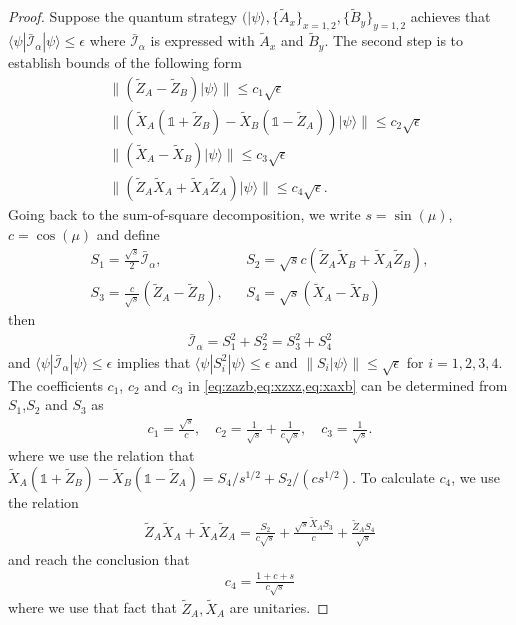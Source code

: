 \documentclass[11pt,letterpaper]{article}
\newcommand{\ket}[1]{|#1\rangle}
\newcommand{\bra}[1]{\langle#1|}
\newcommand{\1}{\mathbb{1}}
\newcommand{\tA}{\tilde{A}}
\newcommand{\tB}{\tilde{B}}
\newcommand{\I}{\mathcal{I}}
\theoremstyle{definition}
\begin{document}
\begin{proof}
Suppose the quantum strategy $(\ket{\psi}, \{\tilde{A}_x\}_{x=1,2}, \{\tilde{B}_{y }\}_{y=1,2}$ achieves that 
$\bra{\psi} \bar{\I}_\alpha \ket{\psi} \leq \epsilon$ where
$\bar{\I}_\alpha$ is expressed with $\tA_x$ and $\tB_y$.
The second step is to establish bounds of the following form
\begin{align}
	\label{eq:zazb} &\|(\tilde{Z}_A-\tilde{Z}_B)\ket{\psi}\| \leq c_1 \sqrt{\epsilon}\\
	\label{eq:xzxz}&\|(\tilde{X}_A(\1+\tilde{Z}_B)-\tilde{X}_B(\1-\tilde{Z}_A))\ket{\psi}\| \leq c_2 \sqrt{\epsilon}\\
	\label{eq:xaxb}&\|(\tilde{X}_A-\tilde{X}_B)\ket{\psi}\| \leq c_3 \sqrt{\epsilon}\\
	\label{eq:anticom} &\|(\tilde{Z}_A\tilde{X}_A+\tilde{X}_A\tilde{Z}_A)\ket{\psi}\| \leq c_4 \sqrt{\epsilon}.
\end{align}
Going back to the sum-of-square decomposition, we write $s = \sin(\mu)$, $c = \cos(\mu)$ and define
\begin{align*}
	S_1 = \frac{\sqrt{s}}{2} \bar{\I}_\alpha, &&
	S_2 = \sqrt{s}c(\tilde{Z}_A\tilde{X}_B+\tilde{X}_A\tilde{Z}_B),\\
	S_3 = \frac{c}{\sqrt{s}}(\tilde{Z}_A-\tilde{Z}_B), &&
	S_4 = \sqrt{s}(\tilde{X}_A-\tilde{X}_B)
\end{align*}
then 
\begin{align}
\bar{\I}_\alpha = S_1^2 + S_2^2 = S_3^2 + S_4^2
\end{align}
 and $\bra{\psi}\bar{\I}_\alpha \ket{\psi} \leq \epsilon$ implies that 
$\bra{\psi}S^2_i \ket{\psi} \leq \epsilon$ and $\|S_i \ket{\psi} \| \leq \sqrt{\epsilon}$ for $i = 1,2,3,4$.
The coefficients $c_1$, $c_2$ and $c_3$ in \cref{eq:zazb,eq:xzxz,eq:xaxb} can be determined from $S_1$,$S_2$ and $S_3$ as
\begin{align*}
	c_1 = \frac{\sqrt{s}}{c}, \quad
	c_2 = \frac{1}{\sqrt{s}} + \frac{1}{c\sqrt{s}}, \quad
	c_3 = \frac{1}{\sqrt{s}}.
\end{align*}
where we use the relation that $\tilde{X}_A(\1+\tilde{Z}_B)-\tilde{X}_B(\1-\tilde{Z}_A) = S_4/s^{1/2} + S_2/(cs^{1/2})$.
To calculate $c_4$, we use the relation
\begin{align}
	\tilde{Z}_A\tilde{X}_A + \tilde{X}_A\tilde{Z}_A = \frac{S_2}{c\sqrt{s}} + \frac{\sqrt{s}\tilde{X}_AS_3}{c} + \frac{\tilde{Z}_AS_4}{\sqrt{s}}
\end{align}
and reach the conclusion that  
\begin{align}
	c_4 = \frac{1+c+s}{c\sqrt{s}}
\end{align}
where we use that fact that $\tilde{Z}_A, \tilde{X}_A$ are unitaries.


\end{proof}
\end{document}
